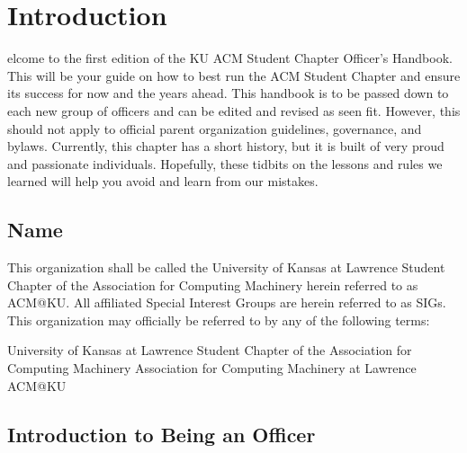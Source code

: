 %
%
\let\textcircled=\pgftextcircled
\chapter{Introduction}
\label{chap:intro}

elcome to the first edition of the KU ACM Student Chapter Officer's Handbook. This will be your guide on how to best run the ACM Student Chapter and ensure its success for now and the years ahead. This handbook is to be passed down to each new group of officers and can be edited and revised as seen fit. However, this should not apply to official parent organization guidelines, governance, and bylaws. Currently, this chapter has a short history, but it is built of very proud and passionate individuals. Hopefully, these tidbits on the lessons and rules we learned will help you avoid and learn from our mistakes.

\section{Name}
\label{sec:sec01}

This organization shall be called the University of Kansas at Lawrence Student Chapter of the Association for Computing Machinery herein referred to as ACM@KU. All affiliated Special Interest Groups are herein referred to as SIGs.
This organization may officially be referred to by any of the following terms:
\begin{itemize}
University of Kansas at Lawrence Student Chapter of the Association for Computing Machinery
Association for Computing Machinery at Lawrence
ACM@KU
\end{itemize}

\section{Introduction to Being an Officer}
\label{sec:sec02}


